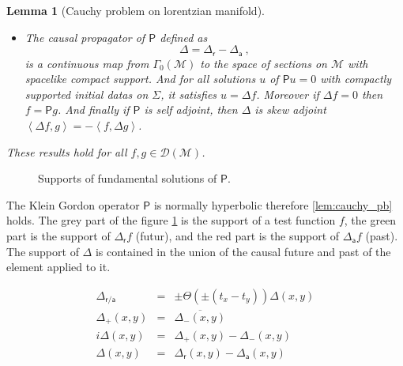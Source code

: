 \documentclass[10pt]{book}
\newcommand{\sm}[1]{\left\langle#1\right\rangle}
\newcommand{\Dcal}{\mathcal{D}}
\newcommand{\Mcal}{\mathcal{M}}
\newcommand{\Psf}{\mathsf{P}}
\newcommand{\asf}{\mathsf{a}}
\newcommand{\rsf}{\mathsf{r}}
\theoremstyle{break}
\newtheorem{lemma}{Lemma}
\begin{document}
\begin{lemma}[Cauchy problem on lorentzian manifold]
\begin{itemize}
\item The causal propagator of $\Psf$ defined as
%
\begin{equation*}
\Delta = \Delta_\rsf - \Delta_\asf \ ,
\end{equation*}
%
is a continuous map from $\Gamma_0(\Mcal)$ to the space of sections on $\Mcal$ with spacelike compact support. And for all solutions $u$ of $\Psf u =0$ with compactly supported initial datas on $\Sigma$, it satisfies $u = \Delta f$. Moreover if $\Delta f =0$ then $f = \Psf g$. And finally if $\Psf$ is self adjoint, then $\Delta$ is skew adjoint $\sm{\Delta f,g} = - \sm{f,\Delta g}$.

\end{itemize}
%
These results hold for all $f, g \in \Dcal(\Mcal)$.
\end{lemma}


\begin{figure}[ht]
\centering
{} 
\caption{Supports of fundamental solutions of $\Psf$.}
\label{fig:supp_sol_fonda}
\end{figure}



The Klein Gordon operator $\Psf$ is normally hyperbolic therefore \ref{lem:cauchy_pb} holds. The grey part of the figure \ref{fig:supp_sol_fonda} is the support of a test function $f$,  the green part is the support of $\Delta_{\mathsf{r}} f$ (futur), and the red part is the support of $\Delta_{\mathsf{a}} f$ (past). The support of $\Delta$ is contained in the union of the causal future and past of the element applied to it.

\bigskip


\begin{eqnarray}
\Delta_{\rsf/\asf} &=& \pm \Theta(\pm(t_x-t_y)) \Delta(x,y) \\
\Delta_+(x,y) &=& \overline{\Delta_-(x,y)} \\
i \Delta(x,y) &=& \Delta_+(x,y) - \Delta_-(x,y) \\
\Delta(x,y) &=& \Delta_\rsf(x,y)-\Delta_\asf(x,y)
\end{eqnarray}
\end{document}
